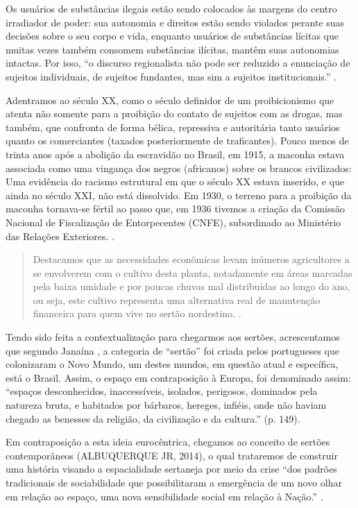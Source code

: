 \begin{refsection}
    Os usuários de substâncias ilegais estão sendo colocados às margens do centro irradiador de poder: sua autonomia e direitos estão sendo violados perante suas decisões sobre o seu corpo e vida, enquanto usuários de substâncias lícitas que muitas vezes também consomem substâncias ilícitas, mantêm suas autonomias intactas. Por isso, ``o discurso regionalista não pode ser reduzido a enunciação de sujeitos individuais, de sujeitos fundantes, mas sim a sujeitos institucionais.'' \cite[p.~61]{AlbuquerqueJr2009Invencao}. 

    Adentramos ao século XX, como o século definidor de um proibicionismo que atenta não somente para a proibição do contato de sujeitos com as drogas, mas também, que confronta de forma bélica, repressiva e autoritária tanto usuários quanto os comerciantes (taxados posteriormente de traficantes). Pouco menos de trinta anos após a abolição da escravidão no Brasil, em 1915, a maconha estava associada como uma vingança dos negros (africanos) sobre os brancos civilizados: Uma evidência do racismo estrutural em que o século XX estava inserido, e que ainda no século XXI, não está dissolvido. Em 1930, o terreno para a proibição da maconha tornava-se fértil ao passo que, em 1936 tivemos a criação da Comissão Nacional de Fiscalização de Entorpecentes (CNFE), subordinado ao Ministério das Relações Exteriores. \cite{Brandao2014Ciclos}.

    \begin{quotation}
        Destacamos que as necessidades econômicas levam inúmeros agricultores a se envolverem com o cultivo desta planta, notadamente em áreas marcadas pela baixa umidade e por poucas chuvas mal distribuídas ao longo do ano, ou seja, este cultivo representa uma alternativa real de manutenção financeira para quem vive no sertão nordestino. \cite[p.~5]{Brandao2014Ciclos}. 
    \end{quotation}

    Tendo sido feita a contextualização para chegarmos aos sertões, acrescentamos que segundo Janaína \textcite{Amado1995Regiao}, a categoria de ``sertão'' foi criada pelos portugueses que colonizaram o Novo Mundo, um destes mundos, em questão atual e específica, está o Brasil. Assim, o espaço em contraposição à Europa, foi denominado assim: ``espaços desconhecidos, inaccessíveis, isolados, perigosos, dominados pela natureza bruta, e habitados por bárbaros, hereges, infiéis, onde não haviam chegado as benesses da religião, da civilização e da cultura.'' (p. 149).

    Em contraposição a esta ideia eurocêntrica, chegamos ao conceito de sertões contemporâneos (ALBUQUERQUE JR, 2014), o qual trataremos de construir uma história visando a espacialidade sertaneja por meio da crise ``dos padrões tradicionais de sociabilidade que possibilitaram a emergência de um novo olhar em relação ao espaço, uma nova sensibilidade social em relação à Nação.'' \cite[p.~52]{AlbuquerqueJr2009Invencao}.


\end{refsection}
